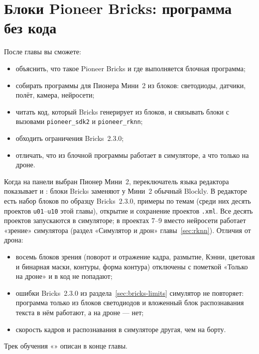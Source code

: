 \section{Блоки Pioneer Bricks: программа без кода}
\label{sec:bricks}

\begin{infobox}
После главы вы сможете:
\begin{itemize}
    \item объяснить, что такое Pioneer Bricks и где выполняется блочная программа;
    \item собирать программы для Пионера Мини~2 из блоков: светодиоды, датчики, полёт, камера, нейросети;
    \item читать код, который Bricks генерирует из блоков, и связывать блоки с вызовами \texttt{pioneer\_sdk2} и \texttt{pioneer\_rknn};
    \item обходить ограничения Bricks~2.3.0;
    \item отличать, что из блочной программы работает в симуляторе, а что только на дроне.
\end{itemize}
\end{infobox}

\begin{missionbox}
Когда на панели  выбран Пионер Мини~2, переключатель языка редактора показывает  и : блоки Bricks заменяют у Мини~2 обычный Blockly. В редакторе есть набор блоков по образцу Bricks~2.3.0, примеры по темам (среди них десять проектов \texttt{u01}--\texttt{u10} этой главы), открытие и сохранение проектов \texttt{.xml}. Все десять проектов запускаются в симуляторе; в проектах 7--9 вместо нейросети работает «зрение» симулятора (раздел «Симулятор и дрон» главы~\ref{sec:rknn}). Отличия от дрона:
\begin{itemize}
    \item восемь блоков зрения (поворот и отражение кадра, размытие, Кэнни, цветовая и бинарная маски, контуры, форма контура) отключены с пометкой «Только на дроне» и в код не попадают;
    \item ошибки Bricks~2.3.0 из раздела~\ref{sec:bricks-limits} симулятор не повторяет: программа только из блоков светодиодов и вложенный блок распознавания текста в нём работают, а на дроне --- нет;
    \item скорость кадров и распознавания в симуляторе другая, чем на борту.
\end{itemize}
Трек обучения «» описан в конце главы.
\end{missionbox}

